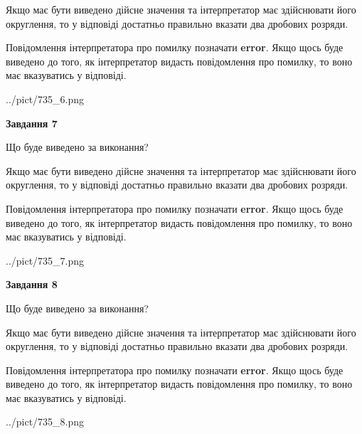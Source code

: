 \documentclass[12pt, ukrainian]{article}
\begin{document}
{\begin {Large}
Якщо має бути виведено дійсне значення та інтерпретатор має здійснювати його округлення, 
то у відповіді достатньо правильно вказати два дробових розряди.

Повідомлення інтерпретатора про помилку позначати \textbf{error}.
Якщо щось буде виведено до того, як інтерпретатор видасть повідомлення про помилку, 
то воно має вказуватись у відповіді. \par

\begin{center}
	{../pict/735_6.png}
\end{center}
\newpage

{\begin {center}\textbf{Завдання 7}\end {center}}\par
Що буде виведено за виконання? \par

Якщо має бути виведено дійсне значення та інтерпретатор має здійснювати його округлення, 
то у відповіді достатньо правильно вказати два дробових розряди.

Повідомлення інтерпретатора про помилку позначати \textbf{error}.
Якщо щось буде виведено до того, як інтерпретатор видасть повідомлення про помилку, 
то воно має вказуватись у відповіді. \par

\begin{center}
	{../pict/735_7.png}
\end{center}
\newpage

{\begin {center}\textbf{Завдання 8}\end {center}}\par
Що буде виведено за виконання? \par

Якщо має бути виведено дійсне значення та інтерпретатор має здійснювати його округлення, 
то у відповіді достатньо правильно вказати два дробових розряди.

Повідомлення інтерпретатора про помилку позначати \textbf{error}.
Якщо щось буде виведено до того, як інтерпретатор видасть повідомлення про помилку, 
то воно має вказуватись у відповіді. \par

\begin{center}
	{../pict/735_8.png}
\end{center}
\newpage


\end{Large}}
\end{document}
